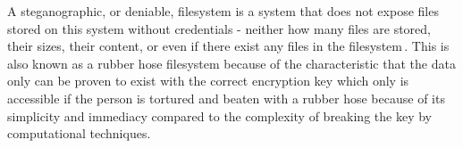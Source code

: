 \label{sec:rubber_hose}
A steganographic, or deniable, filesystem is a system that does not expose files stored on this system without credentials - neither how many files are stored, their sizes, their content, or even if there exist any files in the filesystem\,\cite{andersonSteganographicFileSystem1998}. This is also known as a rubber hose filesystem because of the characteristic that the data only can be proven to exist with the correct encryption key which only is accessible if the person is tortured and beaten with a rubber hose because of its simplicity and immediacy compared to the complexity of breaking the key by computational techniques.

